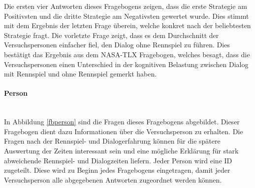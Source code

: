 \documentclass[12pt,a4paper]{scrartcl}
\begin{document}
Die ersten vier Antworten dieses Fragebogens zeigen, dass die erste Strategie am Positivsten und die dritte Strategie am Negativsten gewertet wurde. Dies stimmt mit dem Ergebnis der letzten Frage überein, welche konkret nach der beliebtesten Strategie fragt. \newline \newline Die vorletzte Frage zeigt, dass es dem Durchschnitt der Versuchspersonen einfacher fiel, den Dialog ohne Rennspiel zu führen. Dies bestätigt das Ergebnis aus dem NASA-TLX Fragebogen, welches besagt, dass die Versuchspersonen einen Unterschied in der kognitiven Belastung zwischen Dialog mit Rennspiel und ohne Rennspiel gemerkt haben.  

\paragraph{Person}
\label{fbperson1}
~\\
In Abbildung \ref{fbperson} sind die Fragen dieses Fragebogens abgebildet. Dieser Fragebogen dient dazu Informationen über die Versuchsperson zu erhalten.
Die Fragen nach der Rennspiel- und Dialogerfahrung können für die spätere Auswertung der Zeiten interessant sein und eine mögliche Erklärung für stark abweichende Rennspiel- und Dialogzeiten liefern. \newline \newline
Jeder Person wird eine ID zugeteilt. Diese wird zu Beginn jedes Fragebogens eingetragen, damit jeder Versuchsperson alle abgegebenen Antworten zugeordnet werden können. 
\end{document}
